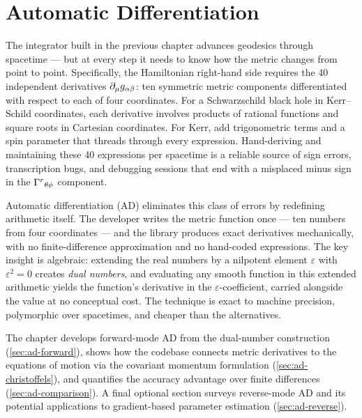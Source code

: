 \chapter{Automatic Differentiation}
\label{ch:autodiff}

The integrator built in the previous chapter advances geodesics through
spacetime --- but at every step it needs to know how the metric changes from
point to point.  Specifically, the Hamiltonian right-hand side requires the
40 independent derivatives $\partial_{\mu} g_{\alpha\beta}$: ten symmetric metric
components differentiated with respect to each of four coordinates.  For a
Schwarzschild black hole in Kerr--Schild coordinates, each derivative
involves products of rational functions and square roots in Cartesian
coordinates.  For Kerr, add trigonometric terms and a spin parameter that
threads through every expression.  Hand-deriving and maintaining these 40
expressions per spacetime is a reliable source of sign errors, transcription
bugs, and debugging sessions that end with a misplaced minus sign in the
$\Gamma^{r}{}_{\theta \phi}$ component.

Automatic differentiation (AD) eliminates this class of errors by
redefining arithmetic itself.  The developer writes the metric function
once --- ten numbers from four coordinates --- and the library produces
exact derivatives mechanically, with no finite-difference approximation
and no hand-coded expressions.  The key insight is algebraic: extending
the real numbers by a nilpotent element $\varepsilon$ with
$\varepsilon^2 = 0$ creates \emph{dual numbers}, and evaluating any smooth
function in this extended arithmetic yields the function's derivative in the
$\varepsilon$-coefficient, carried alongside the value at no conceptual cost.
The technique is exact to machine precision, polymorphic over spacetimes,
and cheaper than the alternatives.

The chapter develops forward-mode AD from the dual-number
construction (\cref{sec:ad-forward}), shows how the codebase
connects metric derivatives to the equations of motion via the
covariant momentum formulation (\cref{sec:ad-christoffels}),
and quantifies the accuracy advantage over finite differences
(\cref{sec:ad-comparison}).  A final optional section surveys
reverse-mode AD and its potential applications to gradient-based
parameter estimation (\cref{sec:ad-reverse}).








